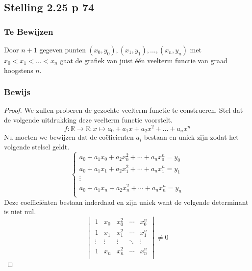 \documentclass[lineaire_algebra_oplossingen.tex]{subfiles}
\begin{document}
\subsection{Stelling 2.25 p 74}
\label{2.25}

\subsubsection*{Te Bewijzen}
Door $n+1$ gegeven punten $(x_0,y_0),(x_1,y_1),...,(x_n,y_n)$ met $x_0 < x_1 < ... < x_n$ gaat de grafiek van juist \'e\'en veelterm functie van graad hoogstens $n$.

\subsubsection*{Bewijs}
\begin{proof}
We zullen proberen de gezochte veelterm functie te construeren.
Stel dat de volgende uitdrukking deze veelterm functie voorstelt.
\[
f: \mathbb{R} \rightarrow \mathbb{R} : x \mapsto a_0 + a_1x + a_2x^2+...+a_nx^n
\]
Nu moeten we bewijzen dat de co\"eficienten $a_i$ bestaan en uniek zijn zodat het volgende stelsel geldt.
\[
\left\lbrace
\begin{array}{ c }
a_0 + a_1x_0 + a_2x_0^2 + \cdots + a_nx_0^n = y_0\\
a_0 + a_1x_1 + a_2x_1^2 + \cdots + a_nx_1^n = y_1\\
\vdots\\
a_0 + a_1x_n + a_2x_n^2 + \cdots + a_nx_n^n = y_n\\
\end{array}
\right.
\]
Deze coeffici\"enten bestaan inderdaad en zijn uniek want de volgende determinant is niet nul.
\[
\begin{vmatrix}
1 & x_0 & x_0^2 & \cdots & x_0^n\\
1 & x_1 & x_1^2 & \cdots & x_1^n\\
\vdots & \vdots & \vdots & \ddots & \vdots \\
1 & x_n & x_n^2 & \cdots & x_n^n\\
\end{vmatrix}
\neq 0
\]
\end{proof}
\end{document}
